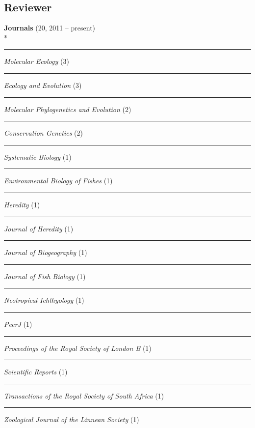 \documentclass[margin,line]{res}
\begin{document}
\begin{resume}

\section{\sc Reviewer}
\textbf{Journals} (20, 2011 -- present)\\*
\rule{-1mm}{5mm} \hspace*{4mm} \textit{Molecular Ecology} (3) \\
\rule{-1mm}{5mm} \hspace*{4mm} \textit{Ecology and Evolution} (3) \\
\rule{-1mm}{5mm} \hspace*{4mm} \textit{Molecular Phylogenetics and Evolution} (2) \\
\rule{-1mm}{5mm} \hspace*{4mm} \textit{Conservation Genetics} (2) \\
\rule{-1mm}{5mm} \hspace*{4mm} \textit{Systematic Biology} (1) \\
\rule{-1mm}{5mm} \hspace*{4mm} \textit{Environmental Biology of Fishes} (1) \\
\rule{-1mm}{5mm} \hspace*{4mm} \textit{Heredity} (1) \\
\rule{-1mm}{5mm} \hspace*{4mm} \textit{Journal of Heredity} (1) \\
\rule{-1mm}{5mm} \hspace*{4mm} \textit{Journal of Biogeography} (1) \\
\rule{-1mm}{5mm} \hspace*{4mm} \textit{Journal of Fish Biology} (1) \\
\rule{-1mm}{5mm} \hspace*{4mm} \textit{Neotropical Ichthyology} (1) \\
\rule{-1mm}{5mm} \hspace*{4mm} \textit{PeerJ} (1) \\
\rule{-1mm}{5mm} \hspace*{4mm} \textit{Proceedings of the Royal Society of London B} (1) \\
\rule{-1mm}{5mm} \hspace*{4mm} \textit{Scientific Reports} (1) \\
\rule{-1mm}{5mm} \hspace*{4mm} \textit{Transactions of the Royal Society of South Africa} (1) \\
\rule{-1mm}{5mm} \hspace*{4mm} \textit{Zoological Journal of the Linnean Society} (1) \\



\end{resume}
\end{document}
